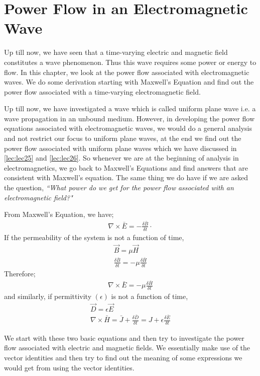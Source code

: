 \chapter{Power Flow in an Electromagnetic Wave}\label{lec:lec27}
Up till now, we have seen that a time-varying electric and magnetic field constitutes a wave phenomenon. Thus this wave requires some power or energy to flow. In this chapter, we look at the power flow associated with electromagnetic waves. We do some derivation starting with Maxwell's Equation and find out the power flow associated with a time-varying electromagnetic field.

Up till now, we have investigated a wave which is called uniform plane wave i.e. a wave propagation in an unbound medium. However, in developing the power flow equations associated with electromagnetic waves, we would do a general analysis and not restrict our focus to uniform plane waves, at the end we find out the power flow associated with uniform plane waves which we have discussed in \autoref{lec:lec25} and \autoref{lec:lec26}. So whenever we are at the beginning of analysis in electromagnetics, we go back to Maxwell's Equations and find answers that are consistent with Maxwell's equation. The same thing we do have if we are asked the question,  \emph{``What power do we get for the power flow associated with an electromagnetic field?"}

From Maxwell's Equation, we have;
\begin{align}
\nabla\times\bar{E}=-\frac{\delta\bar{B}}{\delta t} \cdot 
\end{align} 
If the permeability of the system is not a function of time,
\begin{align}
\vec{B}=\mu \vec{H}\\
\frac{\delta\bar{B}}{\delta t}= -\mu\frac{\delta\bar{H}}{\delta t}
\end{align}
Therefore;
\begin{align}
\nabla\times\bar{E} = -\mu \frac{\delta\bar{H}}{\delta t} 
\end{align} 
and similarly, if permittivity  $(\epsilon) $ is not a function of time,
\begin{align}
\vec{D} = \epsilon \vec{E}\\
\nabla\times\bar{H} =\bar{J} + \frac{\delta\bar{D}}{\delta t}  =  J + \epsilon\frac{\delta\bar{E}}{\delta t} 
\end{align}

We start with these two basic equations and then try to investigate the power flow associated with electric and magnetic fields. We essentially make use of the vector identities and then try to find out the meaning of some expressions we would get from using the vector identities.

